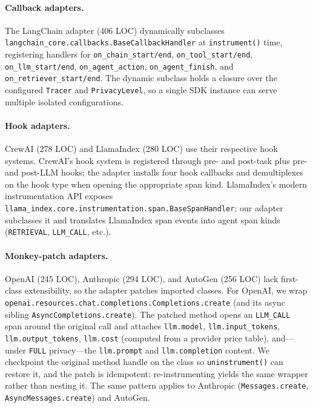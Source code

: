 \documentclass[sigconf,review,anonymous,9pt]{acmart}
\begin{document}
\paragraph{Callback adapters.}
The LangChain adapter (406 LOC) dynamically subclasses
\texttt{langchain\_core.callbacks.BaseCallbackHandler} at
\texttt{instrument()} time, registering handlers for
\texttt{on\_chain\_start/end}, \texttt{on\_tool\_start/end},
\texttt{on\_llm\_start/end}, \texttt{on\_agent\_action},
\texttt{on\_agent\_finish}, and \texttt{on\_retriever\_start/end}.
The dynamic subclass holds a closure over the configured
\texttt{Tracer} and \texttt{PrivacyLevel}, so a single SDK instance
can serve multiple isolated configurations.

\paragraph{Hook adapters.}
CrewAI (278 LOC) and LlamaIndex (280 LOC) use their respective hook
systems. CrewAI's hook system is registered through pre- and
post-task plus pre- and post-LLM hooks; the adapter installs four
hook callbacks and demultiplexes on the hook type when opening
the appropriate span kind. LlamaIndex's modern instrumentation API
exposes \texttt{llama\_index.core.instrumentation.span.BaseSpanHandler};
our adapter subclasses it and translates LlamaIndex span events
into agent span kinds (\texttt{RETRIEVAL}, \texttt{LLM\_CALL}, etc.).

\paragraph{Monkey-patch adapters.}
OpenAI (245 LOC), Anthropic (294 LOC), and AutoGen (256 LOC) lack
first-class extensibility, so the adapter patches imported classes.
For OpenAI, we wrap
\texttt{openai.resources.chat.completions.Completions.create} (and
its async sibling \texttt{AsyncCompletions.create}). The patched
method opens an \texttt{LLM\_CALL} span around the original call and
attaches \texttt{llm.model}, \texttt{llm.input\_tokens},
\texttt{llm.output\_tokens}, \texttt{llm.cost} (computed from a
provider price table), and---under \texttt{FULL} privacy---the
\texttt{llm.prompt} and \texttt{llm.completion} content. We checkpoint
the original method handle on the class so \texttt{uninstrument()}
can restore it, and the patch is idempotent: re-instrumenting yields
the same wrapper rather than nesting it. The same pattern applies to
Anthropic (\texttt{Messages.create}, \texttt{AsyncMessages.create})
and AutoGen.
\end{document}
